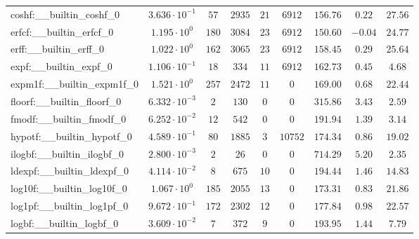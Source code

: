 \begin{tabular}{|l|c|c|c|c|c|c|c|c|}
coshf:\_\_builtin\_coshf\_0               & $ 3.636 \cdot 10^{-1} $ & $ 57     $ & $ 2935  $ & $ 21  $ & $ 6912   $ & $ 156.76      $ & $ 0.22    $ & $ 27.56   $ \\
erfcf:\_\_builtin\_erfcf\_0               & $ 1.195 \cdot 10^{0}  $ & $ 180    $ & $ 3084  $ & $ 23  $ & $ 6912   $ & $ 150.60      $ & $ -0.04   $ & $ 24.77   $ \\
erff:\_\_builtin\_erff\_0                 & $ 1.022 \cdot 10^{0}  $ & $ 162    $ & $ 3065  $ & $ 23  $ & $ 6912   $ & $ 158.45      $ & $ 0.29    $ & $ 25.64   $ \\
expf:\_\_builtin\_expf\_0                 & $ 1.106 \cdot 10^{-1} $ & $ 18     $ & $ 334   $ & $ 11  $ & $ 6912   $ & $ 162.73      $ & $ 0.45    $ & $ 4.68    $ \\
expm1f:\_\_builtin\_expm1f\_0             & $ 1.521 \cdot 10^{0}  $ & $ 257    $ & $ 2472  $ & $ 11  $ & $ 0      $ & $ 169.00      $ & $ 0.68    $ & $ 22.44   $ \\
floorf:\_\_builtin\_floorf\_0             & $ 6.332 \cdot 10^{-3} $ & $ 2      $ & $ 130   $ & $ 0   $ & $ 0      $ & $ 315.86      $ & $ 3.43    $ & $ 2.59    $ \\
fmodf:\_\_builtin\_fmodf\_0               & $ 6.252 \cdot 10^{-2} $ & $ 12     $ & $ 542   $ & $ 0   $ & $ 0      $ & $ 191.94      $ & $ 1.39    $ & $ 3.14    $ \\
hypotf:\_\_builtin\_hypotf\_0             & $ 4.589 \cdot 10^{-1} $ & $ 80     $ & $ 1885  $ & $ 3   $ & $ 10752  $ & $ 174.34      $ & $ 0.86    $ & $ 19.02   $ \\
ilogbf:\_\_builtin\_ilogbf\_0             & $ 2.800 \cdot 10^{-3} $ & $ 2      $ & $ 26    $ & $ 0   $ & $ 0      $ & $ 714.29      $ & $ 5.20    $ & $ 2.35    $ \\
ldexpf:\_\_builtin\_ldexpf\_0             & $ 4.114 \cdot 10^{-2} $ & $ 8      $ & $ 675   $ & $ 10  $ & $ 0      $ & $ 194.44      $ & $ 1.46    $ & $ 14.83   $ \\
log10f:\_\_builtin\_log10f\_0             & $ 1.067 \cdot 10^{0}  $ & $ 185    $ & $ 2055  $ & $ 13  $ & $ 0      $ & $ 173.31      $ & $ 0.83    $ & $ 21.86   $ \\
log1pf:\_\_builtin\_log1pf\_0             & $ 9.672 \cdot 10^{-1} $ & $ 172    $ & $ 2302  $ & $ 12  $ & $ 0      $ & $ 177.84      $ & $ 0.98    $ & $ 22.57   $ \\
logbf:\_\_builtin\_logbf\_0               & $ 3.609 \cdot 10^{-2} $ & $ 7      $ & $ 372   $ & $ 9   $ & $ 0      $ & $ 193.95      $ & $ 1.44    $ & $ 7.79    $ \\

\end{tabular}
